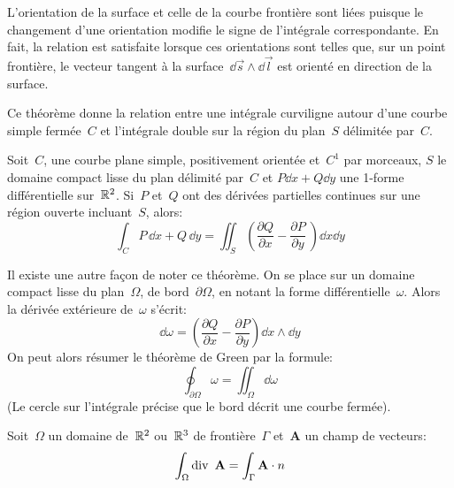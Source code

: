 \medskip
L'orientation de la surface et celle de la courbe frontière sont liées puisque le changement d'une orientation modifie le signe de l'intégrale correspondante.
En fait, la relation est satisfaite lorsque ces orientations sont telles que, sur un point frontière, le vecteur tangent à la surface~$\dd \vec s \wedge \dd \vec l$ est orienté en direction de la surface.


\medskip
\begin{theoreme}%

Ce théorème donne la relation entre une intégrale curviligne autour d'une courbe simple fermée~$C$ et l'intégrale double sur la région du plan~$S$ délimitée par~$C$.

Soit~$C$, une courbe plane simple, positivement orientée et~$C^1$ par morceaux, $S$ le domaine compact lisse du plan délimité par~$C$ et  $P\dd x + Q\dd y$ une 1-forme différentielle sur~$\mathbb R^2$. Si~$P$ et~$Q$ ont des dérivées partielles continues sur une région ouverte incluant~$S$, alors:
\begin{equation}
\int_C P\,\dd x + Q\,\dd y = \iint_S \left( \frac{\partial Q}{\partial x} - \frac{\partial P}{\partial y}\ \right) \dd x\dd y
\end{equation}
\end{theoreme}

\medskip{}
Il existe une autre façon de noter ce théorème.
On se place sur un domaine compact lisse du plan~$\Omega$, de bord~$\partial\Omega$, en notant la forme différentielle~$\omega$.
Alors la dérivée extérieure de~$\omega$ s'écrit:
\begin{equation}
\dd \omega = \left( \frac{\partial Q}{\partial x} - \frac{\partial P}{\partial y} \right) \dd x \wedge \dd y
\end{equation}
On peut alors résumer le théorème de Green par la formule:
\begin{equation}
\oint_{\partial \Omega} \omega = \iint_{\Omega} \dd\omega
\end{equation}
(Le cercle sur l'intégrale précise que le bord décrit une courbe fermée).

\medskip
\begin{theoreme}%
Soit~$\Omega$ un domaine de~$\mathbb R^2$ ou~$\mathbb R^3$ de frontière~$\Gamma$ et~$\mathbf{A}$ un champ de vecteurs:
\begin{equation}
  \int_\Omega \dive\ \mathbf{A} = \int_\Gamma \mathbf{A}\cdot n
\end{equation}
\end{theoreme}

